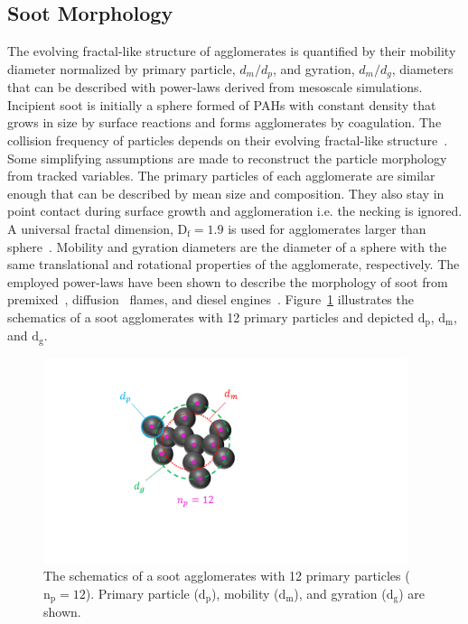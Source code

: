 \subsection{Soot Morphology}
\label{sec:sootmorphology}
The evolving fractal-like structure of agglomerates is quantified by their mobility diameter normalized by primary particle, $d_m/d_p$, and gyration, $d_m/d_g$, diameters that can be described with power-laws derived from mesoscale simulations.
Incipient soot is initially a sphere formed of PAHs with constant density that grows in size by surface reactions and forms agglomerates by coagulation. The collision frequency of particles depends on their evolving fractal-like structure~\citep{mulholland1988cluster}. Some simplifying assumptions are made to reconstruct the particle morphology from tracked variables. The primary particles of each agglomerate are similar enough that can be described by mean size and composition. They also stay in point contact during surface growth and agglomeration i.e. the necking is ignored. A universal fractal dimension,
$\mathrm{D_f=1.9}$ is used for agglomerates larger than sphere~\citep{ball1984finite}.
Mobility and gyration diameters are the diameter of a sphere with the same translational and rotational properties of the agglomerate, respectively. The employed power-laws have been shown to describe the morphology of soot from premixed~\citep{abid2008evolution}, diffusion~\citep{yon2015simple} flames, and diesel engines~\citep{rissler2013effective}. Figure~\ref{fig:Morphology} illustrates the schematics of a soot agglomerates with 12 primary particles and depicted $\mathrm{d_p}$, $\mathrm{d_m}$, and $\mathrm{d_g}$.  
\begin{figure}[!htbp]
	\centering
	\includegraphics[height=60mm, ]{Figures/Morphology.pdf}
	\caption{The schematics of a soot agglomerates with 12 primary particles ($\mathrm{n_p=12}$). Primary particle ($\mathrm{d_p}$), mobility ($\mathrm{d_m}$), and gyration ($\mathrm{d_g}$) are shown.}
	\label{fig:Morphology}
\end{figure} 

